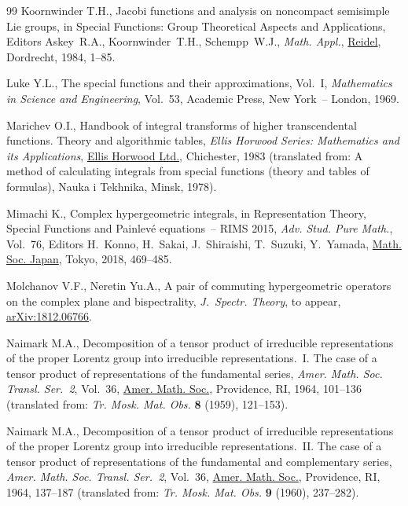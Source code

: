 \documentclass[pdftex]{sigma}
\numberwithin{equation}{section}
\begin{document}
\begin{thebibliography}{99}
Koornwinder T.H., Jacobi functions and analysis on noncompact semisimple {L}ie
 groups, in Special Functions: Group Theoretical Aspects and Applications, Editors Askey~R.A., Koornwinder~T.H., Schempp~W.J.,
 \textit{Math. Appl.}, \href{https://doi.org/10.1007/978-94-010-9787-1_1}{Reidel}, Dordrecht, 1984, 1--85.

Luke Y.L., The special functions and their approximations, {V}ol.~{I},
 \textit{Mathematics in Science and Engineering}, Vol.~53, Academic Press, New
 York~-- London, 1969.

Marichev O.I., Handbook of integral transforms of higher transcendental
 functions. Theory and algorithmic tables, \textit{Ellis Horwood Series: Mathematics
 and its Applications}, \href{https://doi.org/10.1002/zamm.19840640608}{Ellis Horwood Ltd.}, Chichester,
 1983 (translated from: A method of calculating integrals from special functions
(theory and tables of formulas), Nauka i Tekhnika, Minsk, 1978).

Mimachi K., Complex hypergeometric integrals, in Representation Theory, Special
 Functions and {P}ainlev\'e equations~-- {RIMS} 2015, \textit{Adv. Stud. Pure
 Math.}, Vol.~76, Editors H.~Konno, H.~Sakai, J.~Shiraishi, T.~Suzuki,
 Y.~Yamada, \href{https://doi.org/10.2969/aspm/07610469}{Math. Soc. Japan}, Tokyo, 2018, 469--485.

Molchanov V.F., Neretin Yu.A., A pair of commuting hypergeometric operators on
 the complex plane and bispectrality, \textit{J.~Spectr. Theory}, {t}o appear,
 \href{https://arxiv.org/abs/1812.06766}{arXiv:1812.06766}.

Naimark M.A., Decomposition of a tensor product of irreducible representations
 of the proper Lorentz group into irreducible representations.~{I}. {T}he case
 of a tensor product of representations of the fundamental series, \textit{Amer. Math. Soc. Transl. Ser.~2}, Vol.~36, \href{https://doi.org/10.1090/trans2/036/04}{Amer. Math.
 Soc.}, Providence, RI, 1964, 101--136 (translated from: \textit{Tr. Mosk. Mat. Obs.} \textbf{8} (1959), 121--153).

Naimark M.A., Decomposition of a tensor product of irreducible representations
 of the proper {L}orentz group into irreducible representations.~{II}. {T}he
 case of a tensor product of representations of the fundamental and
 complementary series, \textit{Amer. Math. Soc. Transl. Ser.~2}, Vol.~36, \href{https://doi.org/10.1090/trans2/036/04}{Amer. Math. Soc.}, Providence, RI, 1964, 137--187 (translated from: \textit{Tr. Mosk. Mat. Obs.} \textbf{9} (1960), 237--282).


\end{thebibliography}
\end{document}
